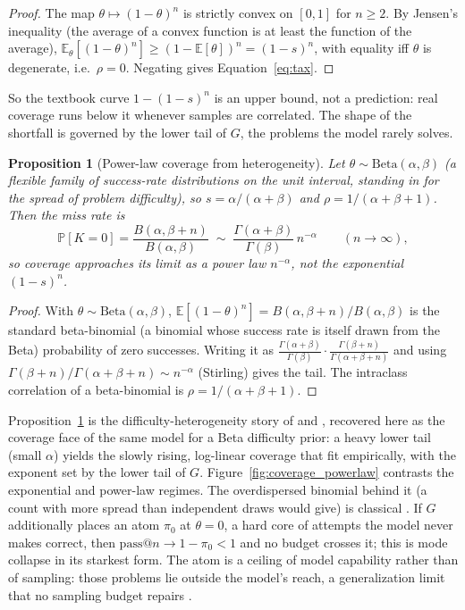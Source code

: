 \documentclass[11pt]{article}
\newtheorem{proposition}{Proposition}
\newcommand{\E}{\mathbb{E}}
\newcommand{\Prob}{\mathbb{P}}
\begin{document}
\begin{proof}
The map $\theta \mapsto (1-\theta)^n$ is strictly convex on $[0,1]$ for $n\ge2$. By Jensen's inequality (the average of a convex function is at least the function of the average), $\E_\theta[(1-\theta)^n] \ge (1-\E[\theta])^n = (1-s)^n$, with equality iff $\theta$ is degenerate, i.e.\ $\rho=0$. Negating gives Equation~\eqref{eq:tax}.
\end{proof}

So the textbook curve $1-(1-s)^n$ is an upper bound, not a prediction: real coverage runs below it whenever samples are correlated. The shape of the shortfall is governed by the lower tail of $G$, the problems the model rarely solves.

\begin{proposition}[Power-law coverage from heterogeneity]
\label{prop:powerlaw}
Let $\theta \sim \mathrm{Beta}(\alpha,\beta)$ (a flexible family of success-rate distributions on the unit interval, standing in for the spread of problem difficulty), so $s = \alpha/(\alpha+\beta)$ and $\rho = 1/(\alpha+\beta+1)$. Then the miss rate is
\begin{equation}
\Prob[K=0] = \frac{B(\alpha, \beta+n)}{B(\alpha,\beta)}
\;\sim\; \frac{\Gamma(\alpha+\beta)}{\Gamma(\beta)}\, n^{-\alpha}
\qquad (n\to\infty),
\label{eq:powerlaw}
\end{equation}
so coverage approaches its limit as a power law $n^{-\alpha}$, not the exponential $(1-s)^n$.
\end{proposition}

\begin{proof}
With $\theta\sim\mathrm{Beta}(\alpha,\beta)$, $\E[(1-\theta)^n] = B(\alpha,\beta+n)/B(\alpha,\beta)$ is the standard beta-binomial (a binomial whose success rate is itself drawn from the Beta) probability of zero successes. Writing it as $\frac{\Gamma(\alpha+\beta)}{\Gamma(\beta)}\cdot\frac{\Gamma(\beta+n)}{\Gamma(\alpha+\beta+n)}$ and using $\Gamma(\beta+n)/\Gamma(\alpha+\beta+n)\sim n^{-\alpha}$ (Stirling) gives the tail. The intraclass correlation of a beta-binomial is $\rho = 1/(\alpha+\beta+1)$.
\end{proof}

Proposition~\ref{prop:powerlaw} is the difficulty-heterogeneity story of \citet{schaeffer2025powerlaws} and \citet{kazdan2025predicting}, recovered here as the coverage face of the same model for a Beta difficulty prior: a heavy lower tail (small $\alpha$) yields the slowly rising, log-linear coverage that \citet{brown2024monkeys} fit empirically, with the exponent set by the lower tail of $G$. Figure~\ref{fig:coverage_powerlaw} contrasts the exponential and power-law regimes. The overdispersed binomial behind it (a count with more spread than independent draws would give) is classical \citep{skellam1948probability}. If $G$ additionally places an atom $\pi_0$ at $\theta=0$, a hard core of attempts the model never makes correct, then $\mathrm{pass}@n \to 1-\pi_0 < 1$ and no budget crosses it; this is mode collapse in its starkest form. The atom is a ceiling of model capability rather than of sampling: those problems lie outside the model's reach, a generalization limit that no sampling budget repairs \citep{bay2024generalization}.
\end{document}
